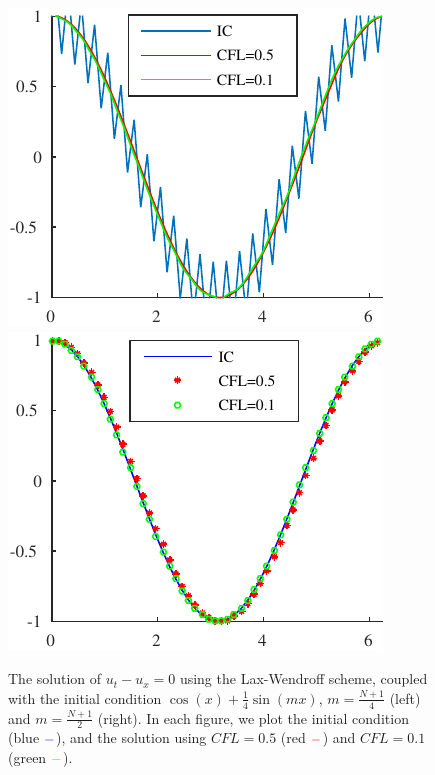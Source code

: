\documentclass[10pt,a4paper,twoside, french]{article}
\numberwithin{equation}{section}
\numberwithin{figure}{section}
\numberwithin{table}{section}
\begin{document}
\begin{enumerate}
\begin{enumerate}[a.]
\begin{figure}
\centering
\includegraphics[scale=1]{fig/LAXW_IC1}
\includegraphics[scale=1]{fig/LAXW_IC2}
\caption{The solution of $u_t-u_x=0$ using the Lax-Wendroff scheme, coupled with the initial condition $\cos(x)+\frac{1}{4}\sin(mx)$, $m=\frac{N+1}{4}$ (left) and $m=\frac{N+1}{2}$ (right). In each figure, we plot the initial condition (blue $\color{blue} -$), and the solution using $CFL=0.5$ (red $\color{red} -$) and $CFL=0.1$ (green $\color{green} -$).}
\end{figure}

\end{enumerate}	
\end{enumerate}
	
	
	
	
\end{document}
